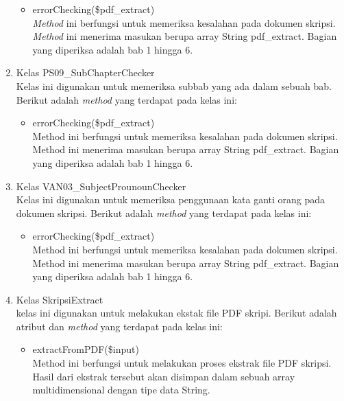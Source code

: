 \begin{enumerate}
		\begin{itemize}
			\item errorChecking(\$pdf\_extract) \\
			\textit{Method} ini berfungsi untuk memeriksa kesalahan pada dokumen skripsi. \textit{Method} ini menerima masukan berupa array String pdf\_extract. Bagian yang diperiksa adalah bab 1 hingga 6.
		\end{itemize}
			
	\item Kelas PS09\_SubChapterChecker \\
	Kelas ini digunakan untuk memeriksa subbab yang ada dalam sebuah bab. Berikut adalah \textit{method} yang terdapat pada kelas ini:
			
		\begin{itemize}
			\item errorChecking(\$pdf\_extract) \\
			Method ini berfungsi untuk memeriksa kesalahan pada dokumen skripsi. Method ini menerima masukan berupa array String pdf\_extract. Bagian yang diperiksa adalah bab 1 hingga 6.
		\end{itemize}
			
	\item Kelas VAN03\_SubjectProunounChecker \\
	Kelas ini digunakan untuk memeriksa penggunaan kata ganti orang pada dokumen skripsi. Berikut adalah \textit{method} yang terdapat pada kelas ini:
	
		\begin{itemize}
			\item errorChecking(\$pdf\_extract) \\
			Method ini berfungsi untuk memeriksa kesalahan pada dokumen skripsi. Method ini menerima masukan berupa array String pdf\_extract. Bagian yang diperiksa adalah bab 1 hingga 6.
		\end{itemize}
			
	\item Kelas SkripsiExtract \\
	kelas ini digunakan untuk melakukan ekstak file PDF skripi. Berikut adalah atribut dan \textit{method} yang terdapat pada kelas ini:
	
		\begin{itemize}
			\item extractFromPDF(\$input) \\
			Method ini berfungsi untuk melakukan proses ekstrak file PDF skripsi. Hasil dari ekstrak tersebut akan disimpan dalam sebuah array multidimensional dengan tipe data String. 
			

\end{itemize}
\end{enumerate}
